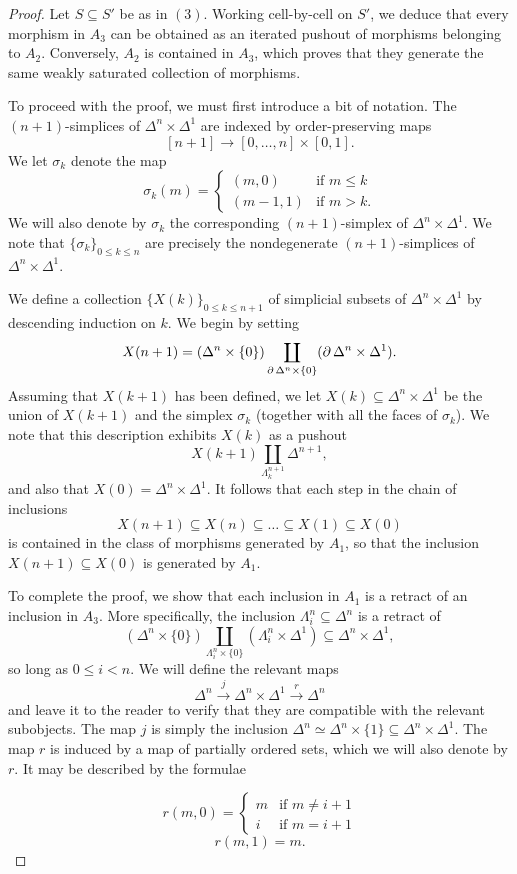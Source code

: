\begin{proof}
Let $S \subseteq S'$ be as in $(3)$. Working cell-by-cell on $S'$,
we deduce that every morphism in $A_3$ can be obtained as an
iterated pushout of morphisms belonging to $A_2$. Conversely,
$A_2$ is contained in $A_3$, which proves that they generate the
same weakly saturated collection of morphisms.

To proceed with the proof, we must first introduce a bit of
notation. The $(n+1)$-simplices of $\Delta^n \times \Delta^1$ are
indexed by order-preserving maps
$$ [n+1] \rightarrow [0, \ldots, n] \times
[0,1].$$ We let $\sigma_k$ denote the map
$$\sigma_k(m) =
\begin{cases} (m,0) & \text{if } m \leq k \\
(m-1,1) & \text{if } m > k. \end{cases}$$ We will also denote by $\sigma_k$
the corresponding $(n+1)$-simplex of $\Delta^n \times
\Delta^1$. We note that $\{ \sigma_k \}_{ 0 \leq k \leq n }$ are
precisely the nondegenerate $(n+1)$-simplices of $\Delta^n \times
\Delta^1$.

We define a collection $\{ X(k) \}_{ 0 \leq k \leq n+1 }$ of
simplicial subsets of $\Delta^n \times \Delta^1$ by descending
induction on $k$. We begin by setting
$$X(n+1) = (\Delta^n \times \{0\}) \coprod_{ \operatorname{\partial} \Delta^n \times \{0\} } (\operatorname{\partial}
\Delta^n \times \Delta^1).$$ Assuming that $X(k+1)$ has been
defined, we let $X(k) \subseteq \Delta^n \times \Delta^1$ be the
union of $X(k+1)$ and the simplex $\sigma_k$ (together with all the
faces of $\sigma_k$). We note that this description exhibits $X(k)$ as a
pushout $$ X(k+1) \coprod_{ \Lambda^{n+1}_k } \Delta^{n+1},$$ and
also that $X(0) = \Delta^{n} \times \Delta^1$. It follows that
each step in the chain of inclusions
$$ X(n+1) \subseteq X(n) \subseteq \ldots \subseteq X(1) \subseteq
X(0)$$ is contained in the class of morphisms generated by $A_1$,
so that the inclusion $X(n+1) \subseteq X(0)$ is generated by
$A_1$.

To complete the proof, we show that each inclusion in
$A_1$ is a retract of an inclusion in $A_3$. More specifically,
the inclusion $\Lambda^{n}_i \subseteq \Delta^{n}$ is a retract of
$$(\Delta^n \times \{0\}) \coprod_{ \Lambda^n_i \times \{0\} } (
\Lambda^n_i \times \Delta^1) \subseteq \Delta^n \times \Delta^1,$$
so long as $0 \leq i < n$. We will define the relevant maps
$$ \Delta^{n} \stackrel{j}{\rightarrow} \Delta^n \times \Delta^1
\stackrel{r}{\rightarrow} \Delta^{n}$$ and leave it to the reader
to verify that they are compatible with the relevant subobjects. The
map $j$ is simply the inclusion
$\Delta^n \simeq \Delta^n \times \{1\} \subseteq \Delta^n \times \Delta^1$.
The map $r$ is induced by a map of partially ordered sets, which we will also denote by $r$. It may be described by the formulae

$$r(m,0) =
\begin{cases} m & \text{if } m \neq i+1 \\
i & \text{if } m = i+1 \end{cases}$$
$$r(m,1) = m.$$
\end{proof}

